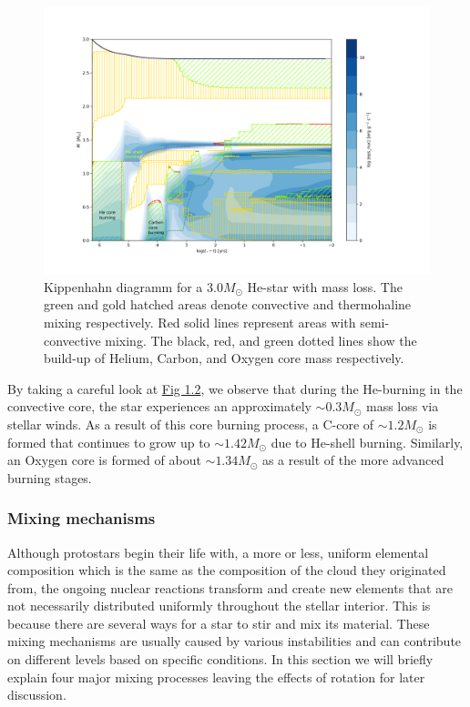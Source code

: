 \documentclass[../../main/thesis_msc.tex]{subfiles}
\begin{document}
				\begin{figure}[h]
					\centering
					\includegraphics[width=\textwidth]{../figures/chapter1/Kippenhahn_3p0_ch1_with_text_final.png}
					\caption{Kippenhahn diagramm for a $3.0 M_{\odot}$ He-star with mass loss. The green and gold hatched areas denote convective and thermohaline mixing respectively. Red solid lines represent areas with semi-convective mixing. The black, red, and green dotted lines show the build-up of Helium, Carbon, and Oxygen core mass respectively.}
					\label{fig:Kipp_3p0_ch1}
				\end{figure}
				
				By taking a careful look at \hyperref[fig:Kipp_3p0_ch1]{Fig 1.2}, we observe that during the He-burning in the convective core, the star experiences an approximately $\sim 0.3 M_{\odot}$ mass loss via stellar winds. As a result of this core burning process, a C-core of $\sim 1.2 M_{\odot}$ is formed that continues to grow up to $\sim 1.42 M_{\odot}$ due to He-shell burning. Similarly, an Oxygen core is formed of about $\sim 1.34 M_{\odot}$ as a result of the more advanced burning stages.
				
				
				
				
				
				
					\subsubsection{Mixing mechanisms}
					
						Although protostars begin their life with, a more or less, uniform elemental composition which is the same as the composition of the cloud they originated from, the ongoing nuclear reactions transform and create new elements that are not necessarily distributed uniformly throughout the stellar interior. This is because there are several ways for a star to stir and mix its material. These mixing mechanisms are usually caused by various instabilities and can contribute on different levels based on specific conditions. In this section we will briefly explain four major mixing processes leaving the effects of rotation for later discussion.
						
\end{document}
